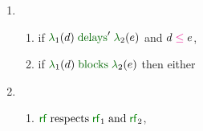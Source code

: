 \begin{figure}
\begin{multicols}{2}
\begin{enumerate}[topsep=0pt,label=(\textsc{s}\arabic*),ref=\textsc{s}\arabic*]
    \item[]
      \begin{enumerate}[leftmargin=0pt]
      \item \label{seq-le-delays-rf}
        if $\labeling_1(\bEv) \rdelaysp \labeling_2(\aEv)$ and
        $\bEv\le\aEv$,
      \item \label{seq-le-blocks}
        if $\labeling_1(\bEv) \rblocks \labeling_2(\aEv)$ then either
      \end{enumerate}
    \item[]
      \begin{enumerate}[leftmargin=0pt]
      \item \label{seq-rf-extends}
        ${\rrfx}\rextends{\rrfx_1}{\rrfx_2}$,

\end{enumerate}
\end{enumerate}
\end{multicols}
\end{figure}
